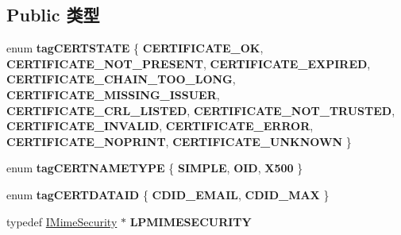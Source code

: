\subsection*{Public 类型}
\begin{DoxyCompactItemize}
\item 
\mbox{\label{interface_m_i_m_e_o_l_e_1_1_i_mime_security_a385f5065d765b5d85508a6a0d04279a0}} 
enum {\bfseries tag\+C\+E\+R\+T\+S\+T\+A\+TE} \{ \newline
{\bfseries C\+E\+R\+T\+I\+F\+I\+C\+A\+T\+E\+\_\+\+OK}, 
{\bfseries C\+E\+R\+T\+I\+F\+I\+C\+A\+T\+E\+\_\+\+N\+O\+T\+\_\+\+P\+R\+E\+S\+E\+NT}, 
{\bfseries C\+E\+R\+T\+I\+F\+I\+C\+A\+T\+E\+\_\+\+E\+X\+P\+I\+R\+ED}, 
{\bfseries C\+E\+R\+T\+I\+F\+I\+C\+A\+T\+E\+\_\+\+C\+H\+A\+I\+N\+\_\+\+T\+O\+O\+\_\+\+L\+O\+NG}, 
\newline
{\bfseries C\+E\+R\+T\+I\+F\+I\+C\+A\+T\+E\+\_\+\+M\+I\+S\+S\+I\+N\+G\+\_\+\+I\+S\+S\+U\+ER}, 
{\bfseries C\+E\+R\+T\+I\+F\+I\+C\+A\+T\+E\+\_\+\+C\+R\+L\+\_\+\+L\+I\+S\+T\+ED}, 
{\bfseries C\+E\+R\+T\+I\+F\+I\+C\+A\+T\+E\+\_\+\+N\+O\+T\+\_\+\+T\+R\+U\+S\+T\+ED}, 
{\bfseries C\+E\+R\+T\+I\+F\+I\+C\+A\+T\+E\+\_\+\+I\+N\+V\+A\+L\+ID}, 
\newline
{\bfseries C\+E\+R\+T\+I\+F\+I\+C\+A\+T\+E\+\_\+\+E\+R\+R\+OR}, 
{\bfseries C\+E\+R\+T\+I\+F\+I\+C\+A\+T\+E\+\_\+\+N\+O\+P\+R\+I\+NT}, 
{\bfseries C\+E\+R\+T\+I\+F\+I\+C\+A\+T\+E\+\_\+\+U\+N\+K\+N\+O\+WN}
 \}
\item 
\mbox{\label{interface_m_i_m_e_o_l_e_1_1_i_mime_security_a7dd3d586d249c44a9d6afd82d9cec3c1}} 
enum {\bfseries tag\+C\+E\+R\+T\+N\+A\+M\+E\+T\+Y\+PE} \{ {\bfseries S\+I\+M\+P\+LE}, 
{\bfseries O\+ID}, 
{\bfseries X500}
 \}
\item 
\mbox{\label{interface_m_i_m_e_o_l_e_1_1_i_mime_security_ac2aed10c59a26c0f6827947d1a87c7e2}} 
enum {\bfseries tag\+C\+E\+R\+T\+D\+A\+T\+A\+ID} \{ {\bfseries C\+D\+I\+D\+\_\+\+E\+M\+A\+IL}, 
{\bfseries C\+D\+I\+D\+\_\+\+M\+AX}
 \}
\item 
\mbox{\label{interface_m_i_m_e_o_l_e_1_1_i_mime_security_ac929fe9d24a20208316fef54fa96a9aa}} 
typedef \hyperlink{interface_m_i_m_e_o_l_e_1_1_i_mime_security}{I\+Mime\+Security} $\ast$ {\bfseries L\+P\+M\+I\+M\+E\+S\+E\+C\+U\+R\+I\+TY}

\end{DoxyCompactItemize}
